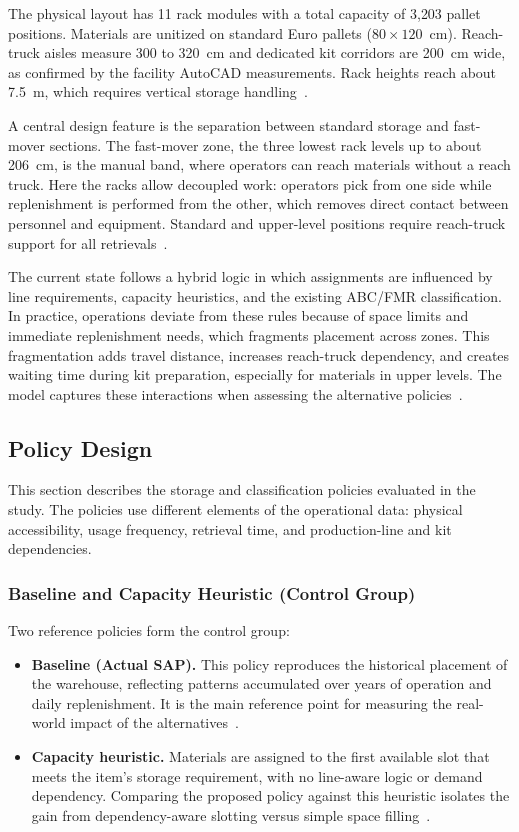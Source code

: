 \documentclass[12pt,a4paper]{article}
\begin{document}
The physical layout has 11 rack modules with a total capacity of 3{,}203
pallet positions. Materials are unitized on standard Euro pallets
($80 \times 120$~cm). Reach-truck aisles measure 300 to 320~cm and dedicated
kit corridors are 200~cm wide, as confirmed by the facility AutoCAD
measurements. Rack heights reach about 7.5~m, which requires vertical storage
handling~\cite{bartholdi2014}.

A central design feature is the separation between standard storage and
fast-mover sections. The fast-mover zone, the three lowest rack levels up to
about 206~cm, is the manual band, where operators can reach materials without
a reach truck. Here the racks allow decoupled work: operators pick from one
side while replenishment is performed from the other, which removes direct
contact between personnel and equipment. Standard and upper-level positions
require reach-truck support for all retrievals~\cite{roodbergen2009}.

The current state follows a hybrid logic in which assignments are influenced
by line requirements, capacity heuristics, and the existing ABC/FMR
classification. In practice, operations deviate from these rules because of
space limits and immediate replenishment needs, which fragments placement
across zones. This fragmentation adds travel distance, increases reach-truck
dependency, and creates waiting time during kit preparation, especially for
materials in upper levels. The model captures these interactions when
assessing the alternative policies~\cite{gu2007}.

\subsection{Policy Design}
This section describes the storage and classification policies evaluated in
the study. The policies use different elements of the operational data:
physical accessibility, usage frequency, retrieval time, and production-line
and kit dependencies.

\subsubsection{Baseline and Capacity Heuristic (Control Group)}
Two reference policies form the control group:
\begin{itemize}
\item \textbf{Baseline (Actual SAP).} This policy reproduces the historical
placement of the warehouse, reflecting patterns accumulated over years of
operation and daily replenishment. It is the main reference point for
measuring the real-world impact of the alternatives~\cite{kokroko2025}.
\item \textbf{Capacity heuristic.} Materials are assigned to the first
available slot that meets the item's storage requirement, with no line-aware
logic or demand dependency. Comparing the proposed policy against this
heuristic isolates the gain from dependency-aware slotting versus simple space
filling~\cite{roodbergen2009}.
\end{itemize}
\end{document}
